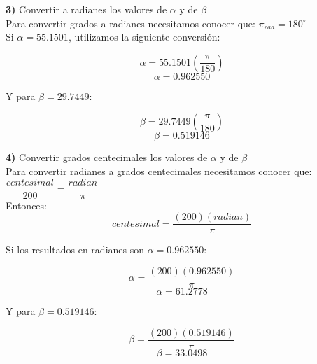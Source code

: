 \documentclass[11pt]{report}
\begin{document}
\pagebreak \indent \textbf { 3)} Convertir a radianes los valores de $\alpha$ y de $\beta$ \\[2mm]
Para convertir grados a radianes necesitamos conocer que: $\pi_{rad}=180^{\circ}$ \\[2mm]
Si $\alpha=55.1501$, utilizamos la siguiente conversión:

$$\alpha=55.1501\left(\frac{\pi}{180}\right)$$
$$\alpha=0.962550$$

Y para $\beta=29.7449$:

$$\beta=29.7449\left(\frac{\pi}{180}\right)$$
$$\beta=0.519146$$


\indent \textbf { 4)} Convertir grados centecimales los valores de $\alpha$ y de $\beta$ \\[2mm]
Para convertir radianes a grados centecimales necesitamos conocer que: $\dfrac{centesimal}{200}=\dfrac{radian}{\pi}$ \\[2mm]
Entonces: 
$$centesimal=\dfrac{(200)(radian)}{\pi}$$

Si los resultados en radianes son $\alpha=0.962550$:

$$\alpha=\dfrac{(200)(0.962550)}{\pi}$$
$$\alpha=61.2778$$

Y para $\beta=0.519146$:

$$\beta=\dfrac{(200)(0.519146)}{\pi}$$
$$\beta=33.0498$$
\end{document}
